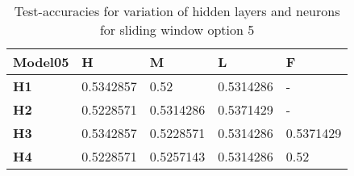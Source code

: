 \begin{table}
\centering
\begin{tabular}{|l|l|l|l|l|}
\hline

\textbf{Model05} & \textbf{H} & \textbf{M} & \textbf{L} & \textbf{F} \\ \hline
\textbf{H1} & 0.5342857 & 0.52 & 0.5314286 & - \\ \hline
\textbf{H2} & 0.5228571 & 0.5314286 & 0.5371429 & - \\ \hline
\textbf{H3} & 0.5342857 & 0.5228571 & 0.5314286 & 0.5371429 \\ \hline
\textbf{H4} & 0.5228571 & 0.5257143 & 0.5314286 & 0.52 \\ \hline

\end{tabular}
\caption{Test-accuracies for variation of hidden layers and neurons for sliding window option 5}
\label{table:nn_variation_sliding_05}
\end{table}

